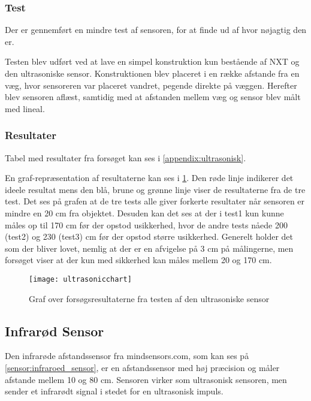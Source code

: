 \subsubsection{Test}
Der er gennemført en mindre test af sensoren, for at finde ud af hvor nøjagtig den er.

Testen blev udført ved at lave en simpel konstruktion kun bestående af NXT og den ultrasoniske sensor.
Konstruktionen blev placeret i en række afstande fra en væg, hvor sensoreren var placeret vandret, pegende direkte på væggen.
Herefter blev sensoren aflæst, samtidig med at afstanden mellem væg og sensor blev målt med lineal.

\subsubsection{Resultater} Tabel med resultater fra forsøget kan ses i \cref{appendix:ultrasonisk}.

En graf-repræsentation af resultaterne kan ses i \cref{sensor:ultrasonic_resultat_diagram}.
Den røde linje indikerer det ideele resultat mens den blå, brune og grønne linje viser de resultaterne fra de tre test.
Det ses på grafen at de tre tests alle giver forkerte resultater når sensoren er mindre en 20 cm fra objektet.
Desuden kan det ses at der i test1 kun kunne måles op til 170 cm før der opstod usikkerhed, hvor de andre tests nåede 200 (test2) og 230 (test3) cm før der opstod større usikkerhed.
Generelt holder det som der bliver lovet, nemlig at der er en afvigelse på 3 cm på målingerne, men forsøget viser at der kun med sikkerhed kan måles mellem 20 og 170 cm.

\begin{figure}[h]
\centering
\texttt{[image: ultrasonicchart]}
\caption{Graf over forsøgsresultaterne fra testen af den ultrasoniske sensor}
\label{sensor:ultrasonic_resultat_diagram}
\end{figure}



\subsection{Infrarød Sensor}
Den infrarøde afstandssensor fra mindsensors.com, som kan ses på \cref{sensor:infraroed_sensor}, er en afstandssensor med høj præcision og måler afstande mellem 10 og 80 cm.
Sensoren virker som ultrasonisk sensoren, men sender et infrarødt signal i stedet for en ultrasonisk impuls.\cite{infrared}


